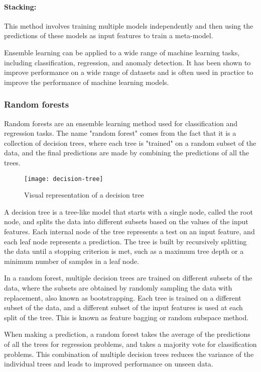 \paragraph{Stacking:} This method involves training multiple models independently and then using the predictions of these models as input features to train a meta-model.

Ensemble learning can be applied to a wide range of machine learning tasks, including classification, regression, and anomaly detection. It has been shown to improve performance on a wide range of datasets and is often used in practice to improve the performance of machine learning models.


\subsubsection{Random forests}

Random forests are an ensemble learning method used for classification and regression tasks. The name "random forest" comes from the fact that it is a collection of decision trees, where each tree is "trained" on a random subset of the data, and the final predictions are made by combining the predictions of all the trees.

\begin{figure}[!htbp]
  \centering
  \texttt{[image: decision-tree]}
  \caption{Visual representation of a decision tree \cite{scikit}}
\end{figure}

A decision tree is a tree-like model that starts with a single node, called the root node, and splits the data into different subsets based on the values of the input features. Each internal node of the tree represents a test on an input feature, and each leaf node represents a prediction. The tree is built by recursively splitting the data until a stopping criterion is met, such as a maximum tree depth or a minimum number of samples in a leaf node.

In a random forest, multiple decision trees are trained on different subsets of the data, where the subsets are obtained by randomly sampling the data with replacement, also known as bootstrapping. Each tree is trained on a different subset of the data, and a different subset of the input features is used at each split of the tree. This is known as feature bagging or random subspace method.

When making a prediction, a random forest takes the average of the predictions of all the trees for regression problems, and takes a majority vote for classification problems. This combination of multiple decision trees reduces the variance of the individual trees and leads to improved performance on unseen data.

